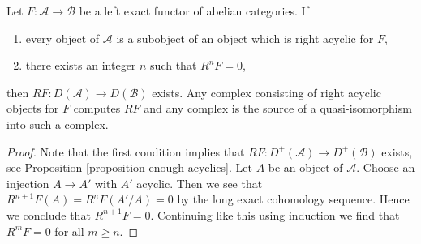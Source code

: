 \begin{lemma}
\label{lemma-unbounded-right-derived}
Let $F : \mathcal{A} \to \mathcal{B}$ be a left exact functor of
abelian categories. If
\begin{enumerate}
\item every object of $\mathcal{A}$ is a subobject of an object
which is right acyclic for $F$,
\item there exists an integer $n$ such that $R^nF = 0$,
\end{enumerate}
then $RF : D(\mathcal{A}) \to D(\mathcal{B})$ exists. Any
complex consisting of right acyclic objects for $F$ computes
$RF$ and any complex is the source of a quasi-isomorphism
into such a complex.
\end{lemma}

\begin{proof}
Note that the first condition implies that
$RF : D^+(\mathcal{A}) \to D^+(\mathcal{B})$ exists, see
Proposition \ref{proposition-enough-acyclics}.
Let $A$ be an object of $\mathcal{A}$. Choose an injection $A \to A'$
with $A'$ acyclic. Then we see that $R^{n + 1}F(A) = R^nF(A'/A) = 0$ by
the long exact cohomology sequence. Hence we conclude that $R^{n + 1}F = 0$.
Continuing like this using induction we find that $R^mF = 0$ for all
$m \geq n$.


\end{proof}
